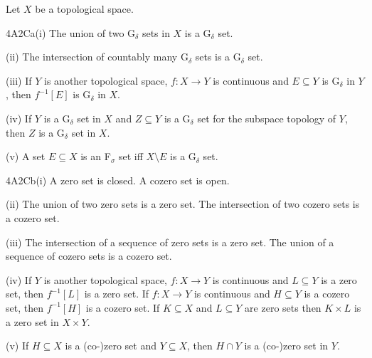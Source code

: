 
 Let
$X$ be a topological space.

\spheader 4A2Ca(i) The union of two G$_{\delta}$ sets in $X$ is a
G$_{\delta}$ set.

\quad (ii) The intersection of countably many G$_{\delta}$ sets is a
G$_{\delta}$ set.

\quad (iii) If $Y$ is another topological space, $f:X\to Y$ is
continuous and $E\subseteq Y$ is G$_{\delta}$ in $Y$,
then $f^{-1}[E]$ is G$_{\delta}$ in $X$.

\quad (iv) If $Y$ is a G$_{\delta}$ set in $X$ and $Z\subseteq Y$ is a
G$_{\delta}$ set for the subspace topology of $Y$, then $Z$ is a
G$_{\delta}$ set in $X$.

\quad (v) A set $E\subseteq X$ is an F$_{\sigma}$ set iff $X\setminus E$
is a G$_{\delta}$ set.

\spheader 4A2Cb(i) A zero set is closed.   A cozero set is open.

\quad (ii) The union of two zero sets is a zero set.
The intersection of two cozero sets is a cozero set.

\quad (iii) The intersection of a sequence of zero sets is a zero set.
The union of a sequence of cozero sets is a cozero set.

\quad (iv) If $Y$ is another topological space, $f:X\to Y$ is continuous
and $L\subseteq Y$ is a zero set, then $f^{-1}[L]$ is a zero set.
If $f:X\to Y$ is continuous and $H\subseteq Y$ is a cozero set, then
$f^{-1}[H]$ is a cozero set.
If $K\subseteq X$ and $L\subseteq Y$ are zero sets then $K\times L$ is a
zero set in $X\times Y$.

\quad (v) If $H\subseteq X$ is a (co-\nobreak)zero set and
$Y\subseteq X$, then $H\cap Y$ is a (co-\nobreak)zero set in $Y$.

